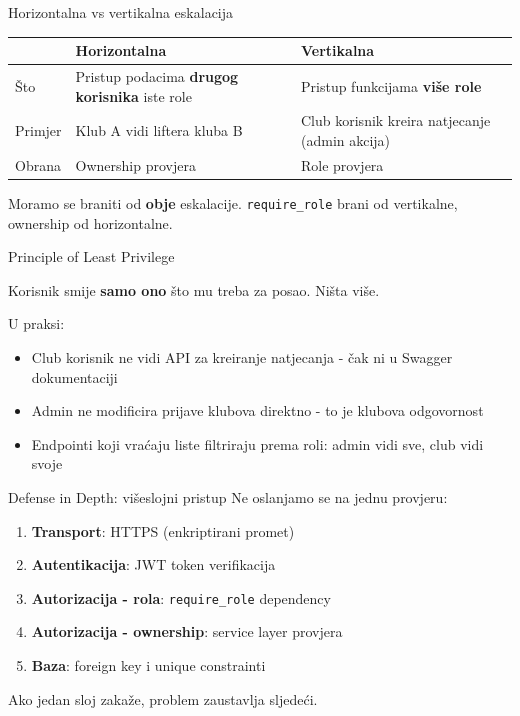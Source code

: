 \begin{frame}{Horizontalna vs vertikalna eskalacija}
\begin{tabular}{@{}lp{5cm}p{5cm}@{}}
  \toprule
  & \textbf{Horizontalna} & \textbf{Vertikalna} \\
  \midrule
  Što & Pristup podacima \textbf{drugog korisnika} iste role & Pristup funkcijama \textbf{više role} \\
  Primjer & Klub A vidi liftera kluba B & Club korisnik kreira natjecanje (admin akcija) \\
  Obrana & Ownership provjera & Role provjera \\
  \bottomrule
\end{tabular}

\vspace{0.6em}
Moramo se braniti od \textbf{obje} eskalacije. \texttt{require\_role} brani od vertikalne, ownership od horizontalne.
\end{frame}

\begin{frame}{Principle of Least Privilege}
\begin{center}
\Large Korisnik smije \textbf{samo ono} što mu treba za posao. Ništa više.
\end{center}

\vspace{0.8em}
U praksi:
\begin{itemize}
  \item Club korisnik ne vidi API za kreiranje natjecanja - čak ni u Swagger dokumentaciji
  \item Admin ne modificira prijave klubova direktno - to je klubova odgovornost
  \item Endpointi koji vraćaju liste filtriraju prema roli: admin vidi sve, club vidi svoje
\end{itemize}
\end{frame}

\begin{frame}{Defense in Depth: višeslojni pristup}
Ne oslanjamo se na jednu provjeru:

\vspace{0.6em}
\begin{enumerate}
  \item \textbf{Transport}: HTTPS (enkriptirani promet)
  \item \textbf{Autentikacija}: JWT token verifikacija
  \item \textbf{Autorizacija - rola}: \texttt{require\_role} dependency
  \item \textbf{Autorizacija - ownership}: service layer provjera
  \item \textbf{Baza}: foreign key i unique constrainti
\end{enumerate}

\vspace{0.6em}
Ako jedan sloj zakaže, problem zaustavlja sljedeći.
\end{frame}

